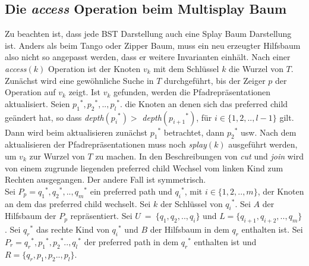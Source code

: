 \documentclass[a4paper,12pt]{article}
\begin{document}
 \subsection{Die \textit{access} Operation beim Multisplay Baum}
 Zu beachten ist, dass jede BST Darstellung auch eine Splay Baum Darstellung ist. Anders als beim Tango oder Zipper Baum, muss ein neu erzeugter Hilfsbaum also nicht so angepasst werden, dass er weitere Invarianten einhält.  Nach einer \textit{access}$\left(k\right)$ Operation ist der Knoten $v_k$ mit dem Schlüssel $k$ die Wurzel von $T$. Zunächst wird eine gewöhnliche Suche in $T$ durchgeführt, bis der Zeiger $p$ der Operation auf $v_k$ zeigt. Ist $v_k$ gefunden, werden die Pfadrepräsentationen aktualisiert. Seien ${p_1}^*,{p_2}^*,..,{p_l}^*.$ die Knoten an denen sich das preferred child geändert hat, so dass \textit{depth}$\left({p_i}^*\right) > $ \textit{depth}$\left({p_{i+1}}^*\right)$, für $i \in \{1, 2,..,l-1\}$ gilt. Dann wird beim aktualisieren zunächst ${p_1}^*$ betrachtet, dann ${p_2}^*$ usw. Nach dem aktualisieren der Pfadrepräsentationen muss noch \textit{splay}$\left(k\right)$ ausgeführt werden, um $v_k$ zur Wurzel von $T$ zu machen. In den Beschreibungen von \textit{cut} und \textit{join} wird von einem zugrunde liegenden preferred child Wechsel vom linken Kind zum Rechten ausgegangen. Der andere Fall ist symmetrisch.\\ 
 \noindent Sei $P_p = {q_1}^*, {q_2}^*,.., {q_m}^*$ ein preferred path und ${q_i}^*$, mit $i \in \{1, 2,..,m\}$, der Knoten  an dem das preferred child wechselt. Sei $k$ der Schlüssel von ${q_i}^*$. Sei $A$ der Hilfsbaum der $P_p$ repräsentiert. Sei $U~=~\{q_1, q_2,.., q_i\}$  und $L= \{q_{i+1}, q_{i+2},..,q_m\}$.  Sei ${q_r}^*$ das rechte Kind von ${q_i}^*$ und $B$ der Hilfsbaum in dem $q_r$ enthalten ist. Sei $P_r = {q_r}^*, {p_1}^*,{p_2}^*.., {q_l}^*$ der preferred path in dem ${q_r}^*$ enthalten ist und  $R= \{ {q_r}, {p_1},{p_2}.., {p_l}\}$.
 


 
\end{document}
